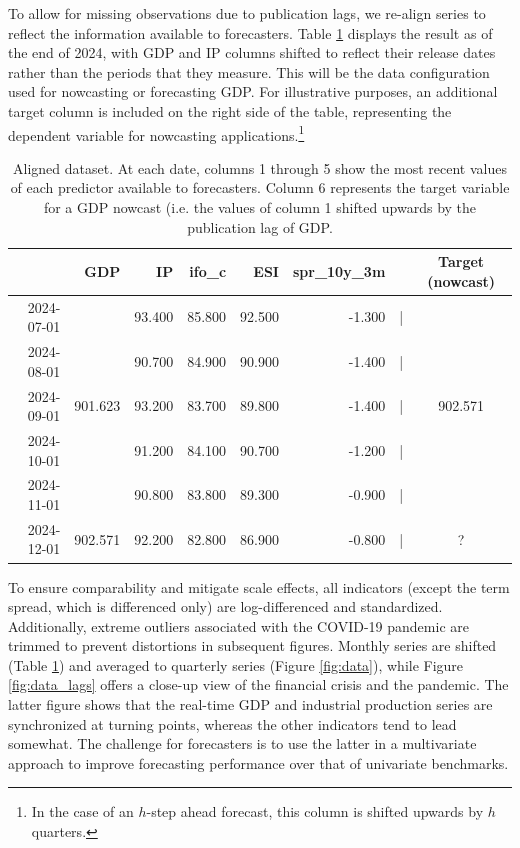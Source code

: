 \documentclass[11pt,a4paper]{article}
\begin{document}
To allow for missing observations due to publication lags, we re-align series to reflect the information available to forecasters. Table \ref{tab:data_stucture_aligned} displays the result as of the end of 2024, with GDP and IP columns shifted to reflect their release dates rather than the periods that they measure. This will be the data configuration used for nowcasting or forecasting GDP. For illustrative purposes, an additional target column is included on the right side of the table, representing the dependent variable for nowcasting applications.\footnote{In the case of an $h$-step ahead forecast, this column is shifted upwards by $h$ quarters.} 


\begin{table}[ht]
\centering
\begin{tabular}{rrrrrrrc}
  \hline
 & GDP & IP & ifo\_c & ESI & spr\_10y\_3m &&Target (nowcast)\\ 
  \hline
  2024-07-01 & & 93.400 & 85.800 & 92.500 & -1.300&|& \\ 
  2024-08-01 & & 90.700&  84.900 & 90.900 & -1.400&| &\\ 
  2024-09-01 & 901.623 &93.200 & 83.700 & 89.800 & -1.400&| &902.571\\ 
  2024-10-01 &  &91.200 & 84.100 & 90.700 & -1.200&| &\\ 
  2024-11-01 &  & 90.800& 83.800 & 89.300 & -0.900&| &\\ 
  2024-12-01 &902.571   & 92.200  & 82.800 & 86.900 & -0.800&| &?\\ 
    \hline
\end{tabular}
\caption{Aligned dataset. At each date, columns 1 through 5 show the most recent values of each predictor available to forecasters. Column 6 represents the target variable for a GDP nowcast (i.e. the values of column 1 shifted upwards by the publication lag of GDP.} 
\label{tab:data_stucture_aligned}
\end{table}



To ensure comparability and mitigate scale effects, all indicators (except the term spread, which is differenced only) are log-differenced and standardized. Additionally, extreme outliers associated with the COVID-19 pandemic are trimmed to prevent distortions in subsequent figures. 
 Monthly series are shifted (Table \ref{tab:data_stucture_aligned}) and averaged to quarterly series (Figure \ref{fig:data}), while Figure \ref{fig:data_lags} offers a close-up view of the financial crisis and the pandemic. The latter figure shows that the real-time GDP and industrial production series are synchronized at turning points, whereas the other indicators tend to lead somewhat. The challenge for forecasters is to use the latter in a multivariate approach to improve forecasting performance over that of univariate benchmarks. 
\end{document}
